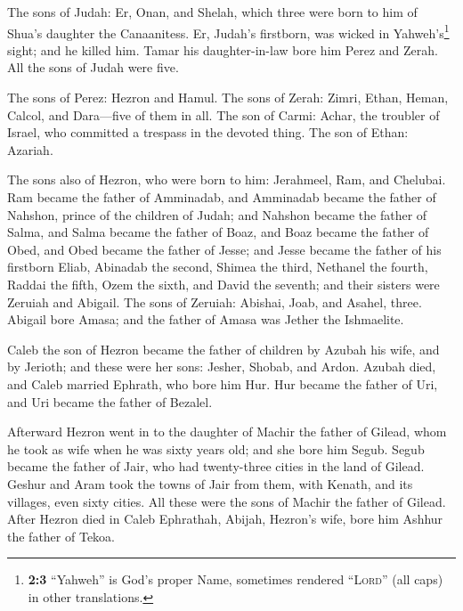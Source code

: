  The sons of Judah: Er, Onan, and Shelah, which three were
born to him of Shua's daughter the Canaanitess. Er, Judah's firstborn,
was wicked in Yahweh's\footnote{\textbf{2:3} ``Yahweh'' is God's proper
  Name, sometimes rendered ``\textsc{Lord}'' (all caps) in other
  translations.} sight; and he killed him.  Tamar his
daughter-in-law bore him Perez and Zerah. All the sons of Judah were
five.

 The sons of Perez: Hezron and Hamul.  The
sons of Zerah: Zimri, Ethan, Heman, Calcol, and Dara---five of them in
all.  The son of Carmi: Achar, the troubler of Israel, who
committed a trespass in the devoted thing.  The son of
Ethan: Azariah.

 The sons also of Hezron, who were born to him: Jerahmeel,
Ram, and Chelubai.  Ram became the father of Amminadab,
and Amminadab became the father of Nahshon, prince of the children of
Judah;  and Nahshon became the father of Salma, and Salma
became the father of Boaz,  and Boaz became the father of
Obed, and Obed became the father of Jesse;  and Jesse
became the father of his firstborn Eliab, Abinadab the second, Shimea
the third,  Nethanel the fourth, Raddai the fifth,
 Ozem the sixth, and David the seventh; 
and their sisters were Zeruiah and Abigail. The sons of Zeruiah:
Abishai, Joab, and Asahel, three.  Abigail bore Amasa;
and the father of Amasa was Jether the Ishmaelite.

 Caleb the son of Hezron became the father of children by
Azubah his wife, and by Jerioth; and these were her sons: Jesher,
Shobab, and Ardon.  Azubah died, and Caleb married
Ephrath, who bore him Hur.  Hur became the father of Uri,
and Uri became the father of Bezalel.

 Afterward Hezron went in to the daughter of Machir the
father of Gilead, whom he took as wife when he was sixty years old; and
she bore him Segub.  Segub became the father of Jair, who
had twenty-three cities in the land of Gilead.  Geshur
and Aram took the towns of Jair from them, with Kenath, and its
villages, even sixty cities. All these were the sons of Machir the
father of Gilead.  After Hezron died in Caleb Ephrathah,
Abijah, Hezron's wife, bore him Ashhur the father of Tekoa.

